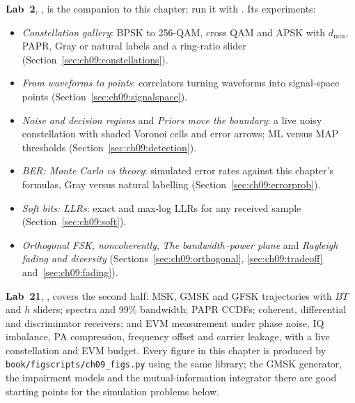 \begin{labbox}
\raggedright
\textbf{Lab~2}, , is the companion to this chapter;
run it with . Its experiments:
\begin{itemize}
\item \emph{Constellation gallery}: BPSK to 256-QAM, cross QAM and APSK with $d_{\min}$, PAPR, Gray
or natural labels and a ring-ratio slider (Section~\ref{sec:ch09:constellations}).
\item \emph{From waveforms to points}: correlators turning waveforms into signal-space points
(Section~\ref{sec:ch09:signalspace}).
\item \emph{Noise and decision regions} and \emph{Priors move the boundary}: a live noisy
constellation with shaded Voronoi cells and error arrows; ML versus MAP thresholds
(Section~\ref{sec:ch09:detection}).
\item \emph{BER: Monte Carlo vs theory}: simulated error rates against this chapter's formulas,
Gray versus natural labelling (Section~\ref{sec:ch09:errorprob}).
\item \emph{Soft bits: LLRs}: exact and max-log LLRs for any received sample
(Section~\ref{sec:ch09:soft}).
\item \emph{Orthogonal FSK, noncoherently}, \emph{The bandwidth--power plane} and \emph{Rayleigh
fading and diversity} (Sections~\ref{sec:ch09:orthogonal}, \ref{sec:ch09:tradeoff}
and~\ref{sec:ch09:fading}).
\end{itemize}
\textbf{Lab~21}, , covers the second half: MSK, GMSK and
GFSK trajectories with $BT$ and $h$ sliders; spectra and 99\% bandwidth; PAPR CCDFs; coherent,
differential and discriminator receivers; and EVM measurement under phase noise, IQ imbalance, PA
compression, frequency offset and carrier leakage, with a live constellation and EVM budget.
Every figure in this chapter is produced by \texttt{book/figscripts/ch09\_figs.py} using the same
library; the GMSK generator, the impairment models and the mutual-information integrator there
are good starting points for the simulation problems below.
\end{labbox}

